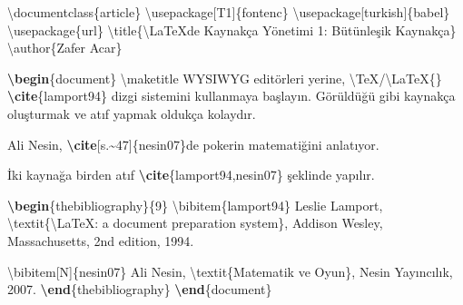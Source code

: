 \documentclass[
  10pt,
]{scrbook}
\newenvironment{Shaded}{}{}
\newcommand{\BuiltInTok}[1]{#1}
\newcommand{\ExtensionTok}[1]{#1}
\newcommand{\FunctionTok}[1]{\textcolor[rgb]{0.02,0.16,0.49}{#1}}
\newcommand{\KeywordTok}[1]{\textcolor[rgb]{0.00,0.44,0.13}{\textbf{#1}}}
\newcommand{\NormalTok}[1]{#1}
\theoremstyle{definition}
\theoremstyle{definition}
\theoremstyle{definition}
\theoremstyle{definition}
\theoremstyle{remark}
\begin{document}
\begin{Shaded}
\begin{Highlighting}[]
\BuiltInTok{\textbackslash{}documentclass}\NormalTok{\{}\ExtensionTok{article}\NormalTok{\}}
\BuiltInTok{\textbackslash{}usepackage}\NormalTok{[T1]\{}\ExtensionTok{fontenc}\NormalTok{\}}
\BuiltInTok{\textbackslash{}usepackage}\NormalTok{[turkish]\{}\ExtensionTok{babel}\NormalTok{\}}
\BuiltInTok{\textbackslash{}usepackage}\NormalTok{\{}\ExtensionTok{url}\NormalTok{\}}
\FunctionTok{\textbackslash{}title}\NormalTok{\{}\FunctionTok{\textbackslash{}LaTeX}\NormalTok{\textquotesingle{}de Kaynakça Yönetimi 1: Bütünleşik Kaynakça\}}
\FunctionTok{\textbackslash{}author}\NormalTok{\{Zafer Acar\}}

\KeywordTok{\textbackslash{}begin}\NormalTok{\{}\ExtensionTok{document}\NormalTok{\}}
\FunctionTok{\textbackslash{}maketitle}
\NormalTok{WYSIWYG editörleri yerine, }\FunctionTok{\textbackslash{}TeX}\NormalTok{/}\FunctionTok{\textbackslash{}LaTeX}\NormalTok{\{\}  }\KeywordTok{\textbackslash{}cite}\NormalTok{\{}\ExtensionTok{lamport94}\NormalTok{\}}
\NormalTok{dizgi sistemini kullanmaya başlayın. Görüldüğü gibi kaynakça oluşturmak }
\NormalTok{ve atıf yapmak oldukça kolaydır.}

\NormalTok{Ali Nesin, }\KeywordTok{\textbackslash{}cite}\NormalTok{[s.\textasciitilde{}47]\{}\ExtensionTok{nesin07}\NormalTok{\}\textquotesingle{}de pokerin matematiğini anlatıyor.}

\NormalTok{İki kaynağa birden atıf }\KeywordTok{\textbackslash{}cite}\NormalTok{\{}\ExtensionTok{lamport94,nesin07}\NormalTok{\} şeklinde yapılır.}

\KeywordTok{\textbackslash{}begin}\NormalTok{\{}\ExtensionTok{thebibliography}\NormalTok{\}\{9\}}
\FunctionTok{\textbackslash{}bibitem}\NormalTok{\{lamport94\}}
\NormalTok{Leslie Lamport,}
\FunctionTok{\textbackslash{}textit}\NormalTok{\{}\FunctionTok{\textbackslash{}LaTeX}\NormalTok{: a document preparation system\}, Addison Wesley,}
\NormalTok{Massachusetts, 2nd edition, 1994.}

\FunctionTok{\textbackslash{}bibitem}\NormalTok{[N]\{nesin07\} Ali Nesin, }\FunctionTok{\textbackslash{}textit}\NormalTok{\{Matematik ve Oyun\}, }
\NormalTok{ Nesin Yayıncılık, 2007.}
\KeywordTok{\textbackslash{}end}\NormalTok{\{}\ExtensionTok{thebibliography}\NormalTok{\}}
\KeywordTok{\textbackslash{}end}\NormalTok{\{}\ExtensionTok{document}\NormalTok{\}}
\end{Highlighting}
\end{Shaded}
\end{document}
